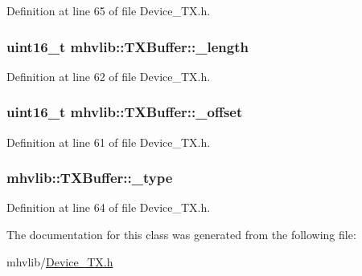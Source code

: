 Definition at line 65 of file Device\-\_\-\-T\-X.\-h.

\hypertarget{classmhvlib_1_1_t_x_buffer_ada6aed89e396de790b054abfff51d198}{
\subsubsection[{\-\_\-length}]{\setlength{\rightskip}{0pt plus 5cm}uint16\-\_\-t mhvlib\-::\-T\-X\-Buffer\-::\-\_\-length\hspace{0.3cm}{\ttfamily [protected]}}}\label{classmhvlib_1_1_t_x_buffer_ada6aed89e396de790b054abfff51d198}


Definition at line 62 of file Device\-\_\-\-T\-X.\-h.

\hypertarget{classmhvlib_1_1_t_x_buffer_a15001ba383e070fd793d8331f0cd9300}{
\subsubsection[{\-\_\-offset}]{\setlength{\rightskip}{0pt plus 5cm}uint16\-\_\-t mhvlib\-::\-T\-X\-Buffer\-::\-\_\-offset\hspace{0.3cm}{\ttfamily [protected]}}}\label{classmhvlib_1_1_t_x_buffer_a15001ba383e070fd793d8331f0cd9300}


Definition at line 61 of file Device\-\_\-\-T\-X.\-h.

\hypertarget{classmhvlib_1_1_t_x_buffer_a7c199ab9f70f9078e6fd469809d8f722}{
\subsubsection[{\-\_\-type}]{ mhvlib\-::\-T\-X\-Buffer\-::\-\_\-type\hspace{0.3cm}{\ttfamily [protected]}}}\label{classmhvlib_1_1_t_x_buffer_a7c199ab9f70f9078e6fd469809d8f722}


Definition at line 64 of file Device\-\_\-\-T\-X.\-h.



The documentation for this class was generated from the following file\-:\begin{DoxyCompactItemize}
\item 
mhvlib/\hyperlink{_device___t_x_8h}{Device\-\_\-\-T\-X.\-h}\end{DoxyCompactItemize}
